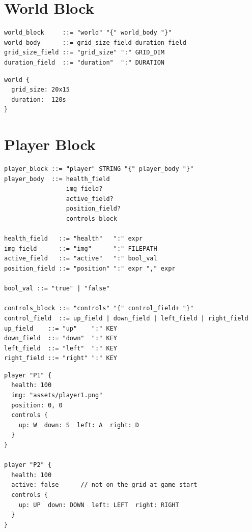 \documentclass[12pt,a4paper]{article}
\begin{document}
\section{World Block}

\begin{lstlisting}[style=bnf]
world_block     ::= "world" "{" world_body "}"
world_body      ::= grid_size_field duration_field
grid_size_field ::= "grid_size" ":" GRID_DIM
duration_field  ::= "duration"  ":" DURATION
\end{lstlisting}

\begin{lstlisting}[style=dsl]
world {
  grid_size: 20x15
  duration:  120s
}
\end{lstlisting}

\section{Player Block}

\begin{lstlisting}[style=bnf]
player_block ::= "player" STRING "{" player_body "}"
player_body  ::= health_field
                 img_field?
                 active_field?
                 position_field?
                 controls_block

health_field   ::= "health"   ":" expr
img_field      ::= "img"      ":" FILEPATH
active_field   ::= "active"   ":" bool_val
position_field ::= "position" ":" expr "," expr

bool_val ::= "true" | "false"

controls_block ::= "controls" "{" control_field+ "}"
control_field  ::= up_field | down_field | left_field | right_field
up_field    ::= "up"    ":" KEY
down_field  ::= "down"  ":" KEY
left_field  ::= "left"  ":" KEY
right_field ::= "right" ":" KEY
\end{lstlisting}

\begin{lstlisting}[style=dsl]
player "P1" {
  health: 100
  img: "assets/player1.png"
  position: 0, 0
  controls {
    up: W  down: S  left: A  right: D
  }
}

player "P2" {
  health: 100
  active: false      // not on the grid at game start
  controls {
    up: UP  down: DOWN  left: LEFT  right: RIGHT
  }
}
\end{lstlisting}
\end{document}
